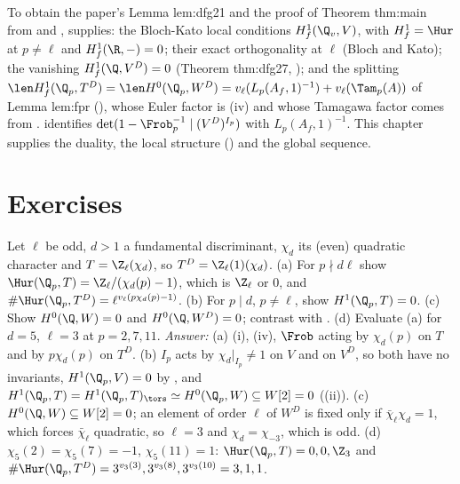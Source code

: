 \begin{remark}\label{rem:galcoh:handover-ch18}
To obtain the paper's Lemma lem:dfg21 and the proof of Theorem thm:main from  and ,  supplies:
the Bloch-Kato local conditions $H^1_f(\Q_v,V)$, with $H^1_f=\Hur$ at $p\ne\ell$ and $H^1_f(\R,-)=0$; their exact orthogonality at $\ell$ (Bloch and Kato); the vanishing
$H^1_f(\Q,V^D)=0$ (Theorem thm:dfg27, \cite[Theorem 2.7]{DFG04}); and the splitting $\len H^1_f(\Q_p,T^D)=\len H^0(\Q_p,W^D)=v_\ell(L_p(A_f,1)^{-1})+v_\ell(\Tam_p(A))$ of Lemma
lem:fpr (\cite[I.4.2.2]{FPR94}), whose Euler factor is (iv) and whose Tamagawa factor comes from
.  identifies $\det(1-\Frob_p^{-1}\mid(V^D)^{I_p})$ with $L_p(A_f,1)^{-1}$. This chapter supplies the duality, the local structure
() and the global sequence.
\end{remark}
\section{Exercises}\label{sec:galcoh:exercises}

\begin{exercise}\label{ex:galcoh:ex-even-twist}
Let $\ell$ be odd, $d>1$ a fundamental discriminant, $\chi_d$ its (even) quadratic character and $T=\Z_\ell(\chi_d)$, so $T^D=\Z_\ell(1)(\chi_d)$. (a) For $p\nmid d\ell$ show
$\Hur(\Q_p,T)=\Z_\ell/(\chi_d(p)-1)$, which is $\Z_\ell$ or $0$, and $\#\Hur(\Q_p,T^D)=\ell^{v_\ell(p\chi_d(p)-1)}$. (b) For $p\mid d$, $p\ne\ell$, show $H^1(\Q_p,T)=0$.
(c) Show $H^0(\Q,W)=0$ and $H^0(\Q,W^D)=0$; contrast with . (d) Evaluate (a) for $d=5$, $\ell=3$ at $p=2,7,11$.
\emph{Answer:} (a) (i), (iv), $\Frob$ acting by $\chi_d(p)$ on $T$ and by $p\chi_d(p)$ on $T^D$. (b) $I_p$ acts by $\chi_d|_{I_p}\ne1$ on $V$ and on
$V^D$, so both have no invariants, $H^1(\Q_p,V)=0$ by , and $H^1(\Q_p,T)=H^1(\Q_p,T)_{\tors}\simeq H^0(\Q_p,W)\subseteq W[2]=0$
((ii)). (c) $H^0(\Q,W)\subseteq W[2]=0$; an element of order $\ell$ of $W^D$ is fixed only if $\bar\chi_\ell\chi_d=1$, which forces $\bar\chi_\ell$ quadratic, so
$\ell=3$ and $\chi_d=\chi_{-3}$, which is odd. (d) $\chi_5(2)=\chi_5(7)=-1$, $\chi_5(11)=1$: $\Hur(\Q_p,T)=0,0,\Z_3$ and $\#\Hur(\Q_p,T^D)=3^{v_3(3)},3^{v_3(8)},3^{v_3(10)}=3,1,1$.
\end{exercise}

